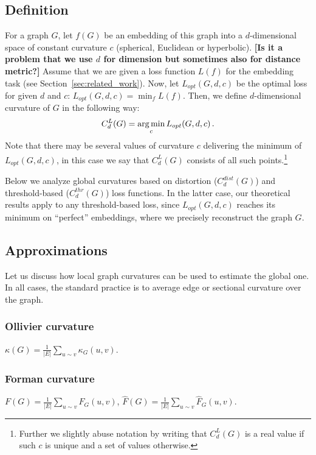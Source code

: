 \documentclass[runningheads]{llncs}
\begin{document}
\subsection{Definition}\label{sec:global_curvature_definition}

For a graph $G$, let $f(G)$ be an embedding of this graph into a $d$-dimensional space of constant curvature $c$ (spherical, Euclidean or hyperbolic). \textbf{[Is it a problem that we use $d$ for dimension but sometimes also for distance metric?]}
Assume that we are given a loss function $L(f)$ for the embedding task (see Section~\ref{sec:related_work}).
Now, let $L_{opt}(G,d,c)$ be the optimal loss for given $d$ and $c$:
$L_{opt}(G,d,c) = \min_{f} L(f).$
Then, we define $d$-dimensional curvature of $G$ in the following way:
\begin{equation}\label{eq:global_curvature}
C_{d}^{L}(G) = \operatorname*{arg\,min}_c L_{opt}(G,d,c)\,.
\end{equation}
Note that there may be several values of curvature $c$ delivering the minimum of $L_{opt}(G,d,c)$, in this case we say that  $C_{d}^{L}(G)$ consists of all such points.\footnote{Further we slightly abuse notation by writing that $C_{d}^{L}(G)$ is a real value if such $c$ is unique and a set of values otherwise.}

Below we analyze global curvatures based on distortion ($C_d^{dist}(G)$) and threshold-based ($C_d^{thr}(G)$) loss functions. 
In the latter case, our theoretical results apply to any threshold-based loss, since 
$L_{opt}(G,d,c)$ reaches its minimum on ``perfect'' embeddings, where we precisely reconstruct the graph $G$.

\subsection{Approximations}

Let us discuss how local graph curvatures can be used to estimate the global one. In all cases, the standard practice is to average edge or sectional curvature over the graph.

\subsubsection{Ollivier curvature} $\kappa(G) = \frac{1}{|E|}\sum\limits_{u\sim v} \kappa_G(u,v)$.

\subsubsection{Forman curvature} $F(G) = \frac{1}{|E|}\sum\limits_{u\sim v} F_G(u,v)$, $\hat F(G) = \frac{1}{|E|}\sum\limits_{u\sim v} \hat F_G(u,v)$.
\end{document}
